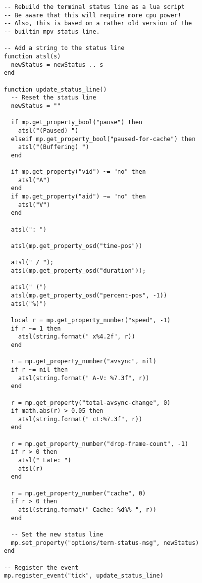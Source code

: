 \documentclass[11pt]{article}
\begin{document}
\lstset{language=lua,label= ,caption= ,captionpos=b,numbers=none}
\begin{lstlisting}
-- Rebuild the terminal status line as a lua script
-- Be aware that this will require more cpu power!
-- Also, this is based on a rather old version of the
-- builtin mpv status line.

-- Add a string to the status line
function atsl(s)
  newStatus = newStatus .. s
end

function update_status_line()
  -- Reset the status line
  newStatus = ""

  if mp.get_property_bool("pause") then
    atsl("(Paused) ")
  elseif mp.get_property_bool("paused-for-cache") then
    atsl("(Buffering) ")
  end

  if mp.get_property("vid") ~= "no" then
    atsl("A")
  end
  if mp.get_property("aid") ~= "no" then
    atsl("V")
  end

  atsl(": ")

  atsl(mp.get_property_osd("time-pos"))

  atsl(" / ");
  atsl(mp.get_property_osd("duration"));

  atsl(" (")
  atsl(mp.get_property_osd("percent-pos", -1))
  atsl("%)")

  local r = mp.get_property_number("speed", -1)
  if r ~= 1 then
    atsl(string.format(" x%4.2f", r))
  end

  r = mp.get_property_number("avsync", nil)
  if r ~= nil then
    atsl(string.format(" A-V: %7.3f", r))
  end

  r = mp.get_property("total-avsync-change", 0)
  if math.abs(r) > 0.05 then
    atsl(string.format(" ct:%7.3f", r))
  end

  r = mp.get_property_number("drop-frame-count", -1)
  if r > 0 then
    atsl(" Late: ")
    atsl(r)
  end

  r = mp.get_property_number("cache", 0)
  if r > 0 then
    atsl(string.format(" Cache: %d%% ", r))
  end

  -- Set the new status line
  mp.set_property("options/term-status-msg", newStatus)
end

-- Register the event
mp.register_event("tick", update_status_line)
\end{lstlisting}
\end{document}
